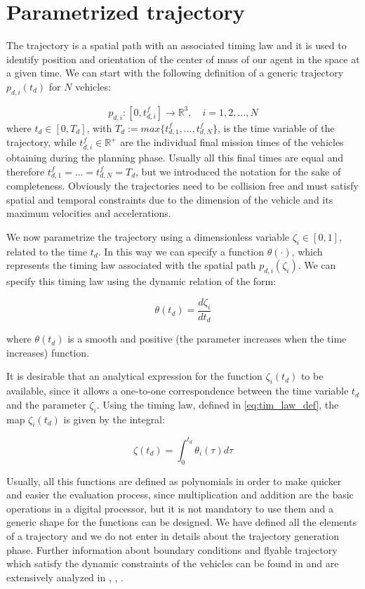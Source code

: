 \section{Parametrized trajectory\label{sec:parametrized_trajectory}}
The trajectory is a spatial path with an associated timing law and it is used
to identify position and orientation of the center of mass of our agent in the space
at a given time.
We can start with the following definition of a generic trajectory $ p_{d,i}(t_d) $
for $ N $ vehicles:

\begin{equation}  \label{eq:traj_def}
  p_{d,i}:[0,t^f_{d,i}] \rightarrow \mathbb{R}^3, \quad i = 1,2,\dots,N
\end{equation}
where $ t_d \in [0, T_d] $, with $T_d := max \{ t^f_{d,1}, \dots , t^f_{d,N} \} $,
is the time variable of the trajectory, while $ t^f_{d,i} \in \mathbb{R}^+ $
are the individual final mission times of the vehicles obtaining during the planning
phase. Usually all this final times are equal and therefore
$ t^f_{d,1} = \dots = t^f_{d,N} = T_d$, but we introduced the notation
for the sake of completeness.
Obviously the trajectories need to be collision free and must satisfy spatial
and temporal constraints due to the dimension of the vehicle and its maximum
velocities and accelerations.

We now parametrize the trajectory using a dimensionless variable $ \zeta_i \in [0,1]$,
related to the time $t_d$. In this way we can specify a function $ \theta( \cdot )$,
which represents the timing law associated with the spatial path $p_{d,i}(\zeta_i)$.
We can specify this timing law using the dynamic relation of the form:

\begin{equation}  \label{eq:tim_law_def}
  \theta( t_d ) = \frac{d \zeta_i}{dt_d}
\end{equation}

where $ \theta( t_d ) $ is a smooth and positive (the parameter increases when
the time increases) function.

It is desirable that an analytical expression for the function $ \zeta_i (t_d) $
to be available, since it allows a one-to-one correspondence between the time
variable $t_d$ and the parameter $ \zeta_i $.
Using the timing law, defined in \eqref{eq:tim_law_def}, the map $ \zeta_i ( t_d) $
is given by the integral:

\begin{equation}  \label{eq:zeta_law_def}
  \zeta( t_d ) = \int^{t_d}_0 \theta_i(\tau) d \tau
\end{equation}

Usually, all this functions are defined as polynomials in order to make quicker and
easier the evaluation process, since multiplication and addition are the basic
operations in a digital processor, but it is not mandatory to use them and a
generic shape for the functions can be designed.
We have defined all the elements of a trajectory and we do not enter in details
about the trajectory generation phase.
Further information about boundary conditions and flyable trajectory which satisfy
the dynamic constraints of the vehicles can be found in \cite{cichellaMain} and
are extensively analyzed in \cite{trajGeneration1}, \cite{trajGeneration2},
\cite{trajGeneration3}.
